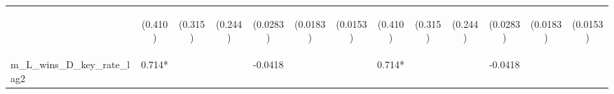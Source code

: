 \documentclass[]{article}
\begin{document}
\begin{center}
\begin{tabular}{lcccccccccccc}
\vspace{4pt} & \begin{footnotesize}(0.410)\end{footnotesize} & \begin{footnotesize}(0.315)\end{footnotesize} & \begin{footnotesize}(0.244)\end{footnotesize} & \begin{footnotesize}(0.0283)\end{footnotesize} & \begin{footnotesize}(0.0183)\end{footnotesize} & \begin{footnotesize}(0.0153)\end{footnotesize} & \begin{footnotesize}(0.410)\end{footnotesize} & \begin{footnotesize}(0.315)\end{footnotesize} & \begin{footnotesize}(0.244)\end{footnotesize} & \begin{footnotesize}(0.0283)\end{footnotesize} & \begin{footnotesize}(0.0183)\end{footnotesize} & \begin{footnotesize}(0.0153)\end{footnotesize} \\
m\_L\_wins\_D\_key\_rate\_lag2 & 0.714* &  &  & -0.0418 &  &  & 0.714* &  &  & -0.0418 &  &  \\

\end{tabular}
\end{center}
\end{document}
